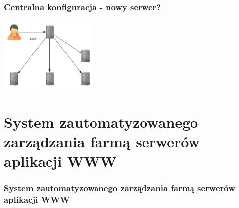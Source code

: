 \documentclass[12pt]{beamer}
\begin{document}
\begin{frame}
\frametitle{Centralna konfiguracja - nowy serwer?}
\begin{center}
\includegraphics[width=180px]{img/zarzadzanie5.png}
\end{center}
\end{frame}

\section[SZZ]{System zautomatyzowanego zarządzania farmą serwerów aplikacji WWW}
\begin{frame}
\frametitle{System zautomatyzowanego zarządzania farmą serwerów aplikacji WWW}
\end{frame}
\frame{\titlepage}
\end{document}

